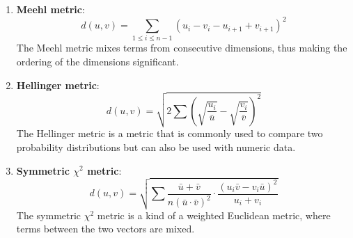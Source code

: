 \documentclass[conference]{IEEEtran}
\begin{document}
\begin{enumerate}
    \item \textbf{Meehl metric}:\\
    \begin{equation} \label{eq:meehl_metric}
        d(u,v)=\sum_{1 \leq i \leq n-1}\left(u_{i}-v_{i}-u_{i+1}+v_{i+1}\right)^{2}
    \end{equation}
    The Meehl metric mixes terms from consecutive dimensions, thus making the ordering of the dimensions significant.

    \item \textbf{Hellinger metric}:\\
    \begin{equation} \label{eq:hellinger_metric}
        d(u,v)=\sqrt{2 \sum\left(\sqrt{\frac{u_{i}}{\bar{u}}}-\sqrt{\frac{v_{i}}{\bar{v}}}\right)^{2}}
    \end{equation}
    The Hellinger metric is a metric that is commonly used to compare two probability distributions but can also be used with numeric data.

    \item \textbf{Symmetric $\chi^2$ metric}:\\
    \begin{equation} \label{eq:symmetric_chi_2_metric}
        d(u,v)=\sqrt{\sum \frac{\bar{u}+\bar{v}}{n(\bar{u} \cdot \bar{v})^{2}} \cdot \frac{\left(u_{i} \bar{v}-v_{i} \bar{u}\right)^{2}}{u_{i}+v_{i}}}
    \end{equation}
    The symmetric $\chi^2$ metric is a kind of a weighted Euclidean metric, where terms between the two vectors are mixed.
\end{enumerate}
\end{document}

